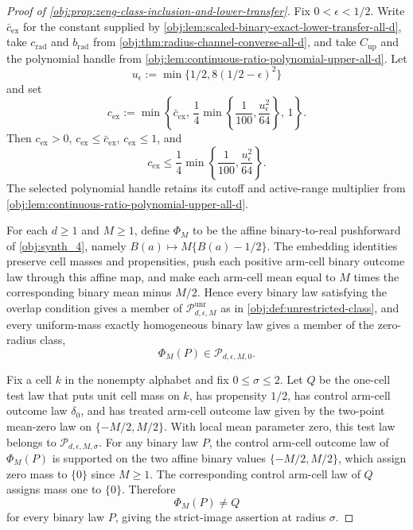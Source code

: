 \documentclass[11pt]{article}
\begin{document}
\begin{proof}[Proof of \cref{obj:prop:zeng-class-inclusion-and-lower-transfer}]
Fix \(0<\epsilon<1/2\).  Write \(\bar c_{\mathrm{ex}}\) for the constant supplied by \cref{obj:lem:scaled-binary-exact-lower-transfer-all-d}, take \(c_{\mathrm{rad}}\) and \(b_{\mathrm{rad}}\) from \cref{obj:thm:radius-channel-converse-all-d}, and take \(C_{\mathrm{up}}\) and the polynomial handle from \cref{obj:lem:continuous-ratio-polynomial-upper-all-d}.  Let
\[
u_{
\epsilon}:=\min\{1/2,8(1/2-\epsilon)^2\}
\]
and set
\[
c_{\mathrm{ex}}
:=
\min\left\{
\bar c_{\mathrm{ex}},\,
\frac14\min\left\{\frac1{100},\frac{u_{\epsilon}^2}{64}\right\},\,
1
\right\}.
\]
Then \(c_{\mathrm{ex}}>0\), \(c_{\mathrm{ex}}\le \bar c_{\mathrm{ex}}\), \(c_{\mathrm{ex}}\le1\), and
\[
c_{\mathrm{ex}}\le
\frac14\min\left\{\frac1{100},\frac{u_{\epsilon}^2}{64}\right\}.
\]
The selected polynomial handle retains its cutoff and active-range multiplier from \cref{obj:lem:continuous-ratio-polynomial-upper-all-d}. %

For each \(d\ge1\) and \(M\ge1\), define \(\Phi_M\) to be the affine binary-to-real pushforward of \cref{obj:synth_4}, namely \(B(a)\mapsto M\{B(a)-1/2\}\).  The embedding identities preserve cell masses and propensities, push each positive arm-cell binary outcome law through this affine map, and make each arm-cell mean equal to \(M\) times the corresponding binary mean minus \(M/2\).  Hence every binary law satisfying the overlap condition gives a member of \(\mathcal P_{d,\epsilon,M}^{\mathrm{unr}}\) as in \cref{obj:def:unrestricted-class}, and every uniform-mass exactly homogeneous binary law gives a member of the zero-radius class,
\[
\Phi_M(P)\in\mathcal P_{d,\epsilon,M,0}.
\]

Fix a cell \(k\) in the nonempty alphabet and fix \(0\le\sigma\le2\).  Let \(Q\) be the one-cell test law that puts unit cell mass on \(k\), has propensity \(1/2\), has control arm-cell outcome law \(\delta_0\), and has treated arm-cell outcome law given by the two-point mean-zero law on \(\{-M/2,M/2\}\).  With local mean parameter zero, this test law belongs to \(\mathcal P_{d,\epsilon,M,\sigma}\).  For any binary law \(P\), the control arm-cell outcome law of \(\Phi_M(P)\) is supported on the two affine binary values \(\{-M/2,M/2\}\), which assign zero mass to \(\{0\}\) since \(M\ge1\).  The corresponding control arm-cell law of \(Q\) assigns mass one to \(\{0\}\).  Therefore
\[
\Phi_M(P)\ne Q
\]
for every binary law \(P\), giving the strict-image assertion at radius \(\sigma\). %


\end{proof}
\end{document}
